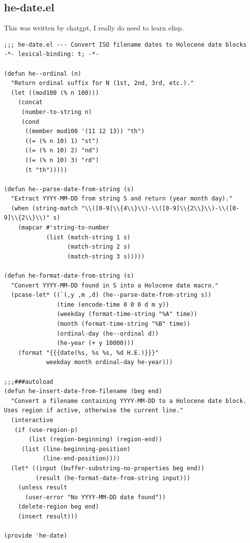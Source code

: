 \documentclass[10pt]{article}
\begin{document}
\subsection{he-date.el}
\label{sec:org72c70a5}
This was written by chatgpt, I really do need to learn elisp.
\begin{verbatim}
;;; he-date.el --- Convert ISO filename dates to Holocene date blocks -*- lexical-binding: t; -*-

(defun he--ordinal (n)
  "Return ordinal suffix for N (1st, 2nd, 3rd, etc.)."
  (let ((mod100 (% n 100)))
    (concat
     (number-to-string n)
     (cond
      ((member mod100 '(11 12 13)) "th")
      ((= (% n 10) 1) "st")
      ((= (% n 10) 2) "nd")
      ((= (% n 10) 3) "rd")
      (t "th")))))

(defun he--parse-date-from-string (s)
  "Extract YYYY-MM-DD from string S and return (year month day)."
  (when (string-match "\\([0-9]\\{4\\}\\)-\\([0-9]\\{2\\}\\)-\\([0-9]\\{2\\}\\)" s)
    (mapcar #'string-to-number
            (list (match-string 1 s)
                  (match-string 2 s)
                  (match-string 3 s)))))

(defun he-format-date-from-string (s)
  "Convert YYYY-MM-DD found in S into a Holocene date macro."
  (pcase-let* ((`(,y ,m ,d) (he--parse-date-from-string s))
               (time (encode-time 0 0 0 d m y))
               (weekday (format-time-string "%A" time))
               (month (format-time-string "%B" time))
               (ordinal-day (he--ordinal d))
               (he-year (+ y 10000)))
    (format "{{{date(%s, %s %s, %d H.E.)}}}"
            weekday month ordinal-day he-year)))

;;;###autoload
(defun he-insert-date-from-filename (beg end)
  "Convert a filename containing YYYY-MM-DD to a Holocene date block.
Uses region if active, otherwise the current line."
  (interactive
   (if (use-region-p)
       (list (region-beginning) (region-end))
     (list (line-beginning-position)
           (line-end-position))))
  (let* ((input (buffer-substring-no-properties beg end))
         (result (he-format-date-from-string input)))
    (unless result
      (user-error "No YYYY-MM-DD date found"))
    (delete-region beg end)
    (insert result)))

(provide 'he-date)
\end{verbatim}
\end{document}
